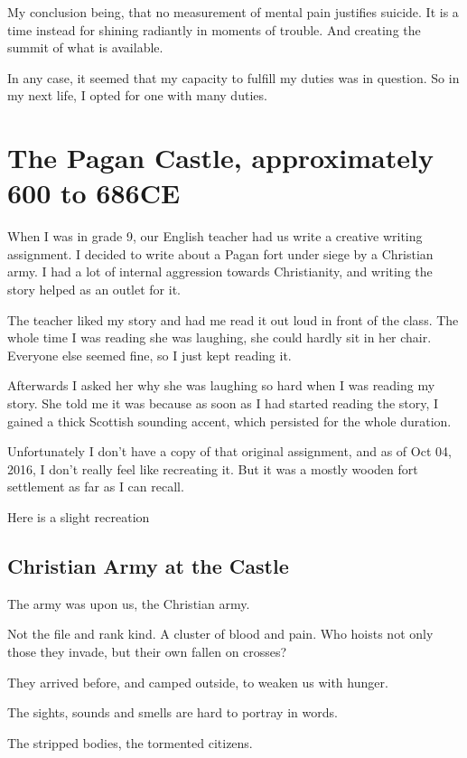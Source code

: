My conclusion being, that no measurement of mental pain justifies suicide. It
is a time instead for shining radiantly in moments of trouble. And creating the
summit of what is available. 

In any case, it seemed that my capacity to fulfill my duties was in question. So
in my next life, I opted for one with many duties.

\chapter{The Pagan Castle, approximately 600 to 686CE}\label{reincarnation:arwald}
When I was in grade 9, our English teacher had us write a creative writing
assignment. I decided to write about a Pagan fort under siege by a Christian
army.  I had a lot of internal aggression towards Christianity, and writing the
story helped as an outlet for it. 

The teacher liked my story and had me read it out loud in front of the class.
The whole time I was reading she was laughing, she could hardly sit in her
chair. Everyone else seemed fine, so I just kept reading it. 

Afterwards I asked her why she was laughing so hard when I was reading my story. 
She told me it was because as soon as I had started reading the story, I gained
a thick Scottish sounding accent, which persisted for the whole duration. 

Unfortunately I don't have a copy of that original assignment, and as of Oct
04, 2016, I don't really feel like recreating it. But it was a mostly wooden 
fort settlement as far as I can recall. 

Here is a slight recreation

\section{Christian Army at the Castle}
The army was upon us, the Christian army.

Not the file and rank kind. A cluster of blood and pain. 
Who hoists not only those they invade, but their own fallen on crosses?

They arrived before, and camped outside, to weaken us with hunger. 

The sights, sounds and smells are hard to portray in words. 

The stripped bodies, the tormented citizens. 

